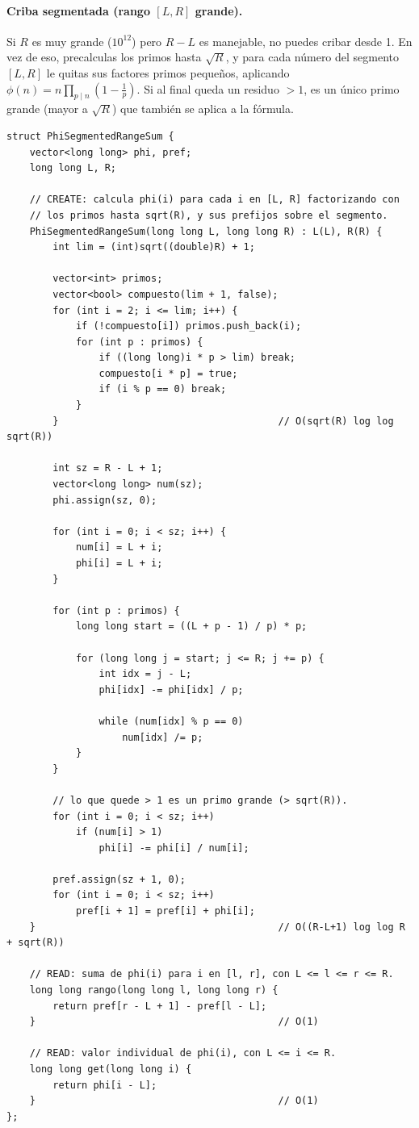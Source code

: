 \documentclass[10pt,a4paper,twocolumn]{article}
\begin{document}
\paragraph{Criba segmentada (rango $[L,R]$ grande).}

Si $R$ es muy grande ($10^{12}$) pero $R-L$ es manejable, no puedes
cribar desde 1. En vez de eso, precalculas los primos hasta
$\sqrt R$, y para cada número del segmento $[L,R]$ le quitas sus
factores primos pequeños, aplicando $\phi(n) = n\prod_{p\mid
n}(1-\tfrac1p)$. Si al final queda un residuo $>1$, es un único
primo grande (mayor a $\sqrt R$) que también se aplica a la fórmula.

\begin{lstlisting}[style=cpp]
struct PhiSegmentedRangeSum {
    vector<long long> phi, pref;
    long long L, R;

    // CREATE: calcula phi(i) para cada i en [L, R] factorizando con
    // los primos hasta sqrt(R), y sus prefijos sobre el segmento.
    PhiSegmentedRangeSum(long long L, long long R) : L(L), R(R) {
        int lim = (int)sqrt((double)R) + 1;

        vector<int> primos;
        vector<bool> compuesto(lim + 1, false);
        for (int i = 2; i <= lim; i++) {
            if (!compuesto[i]) primos.push_back(i);
            for (int p : primos) {
                if ((long long)i * p > lim) break;
                compuesto[i * p] = true;
                if (i % p == 0) break;
            }
        }                                      // O(sqrt(R) log log sqrt(R))

        int sz = R - L + 1;
        vector<long long> num(sz);
        phi.assign(sz, 0);

        for (int i = 0; i < sz; i++) {
            num[i] = L + i;
            phi[i] = L + i;
        }

        for (int p : primos) {
            long long start = ((L + p - 1) / p) * p;

            for (long long j = start; j <= R; j += p) {
                int idx = j - L;
                phi[idx] -= phi[idx] / p;

                while (num[idx] % p == 0)
                    num[idx] /= p;
            }
        }

        // lo que quede > 1 es un primo grande (> sqrt(R)).
        for (int i = 0; i < sz; i++)
            if (num[i] > 1)
                phi[i] -= phi[i] / num[i];

        pref.assign(sz + 1, 0);
        for (int i = 0; i < sz; i++)
            pref[i + 1] = pref[i] + phi[i];
    }                                          // O((R-L+1) log log R + sqrt(R))

    // READ: suma de phi(i) para i en [l, r], con L <= l <= r <= R.
    long long rango(long long l, long long r) {
        return pref[r - L + 1] - pref[l - L];
    }                                          // O(1)

    // READ: valor individual de phi(i), con L <= i <= R.
    long long get(long long i) {
        return phi[i - L];
    }                                          // O(1)
};
\end{lstlisting}
\end{document}
